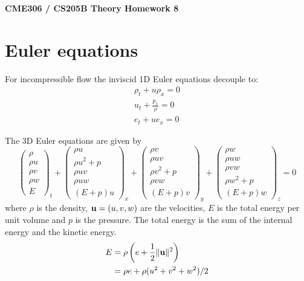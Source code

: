 \documentclass{article}
\begin{document}
\begin{center}
{\bf CME306 / CS205B Theory Homework 8}
\end{center}
\renewcommand{\u}{\ensuremath{{\bf u}}}

\section*{Euler equations}
For incompressible flow the inviscid 1D Euler equations decouple to:
\begin{align*}
  \rho_t + u\rho_x = 0 \\
  u_t + \frac{p_x}{\rho} = 0 \\
  e_t + ue_x = 0
\end{align*}

The 3D Euler equations are given by
\begin{equation}
  \begin{pmatrix}
    \rho \\ \rho u \\ \rho v \\ \rho w \\ E
  \end{pmatrix}_t + 
  \begin{pmatrix}
    \rho u \\ \rho u^2 + p \\ \rho uv \\ \rho uw \\ (E+p)u
  \end{pmatrix}_x + 
  \begin{pmatrix}
    \rho v \\ \rho uv \\ \rho v^2 + p \\ \rho vw \\ (E+p)v
  \end{pmatrix}_y + 
  \begin{pmatrix}
    \rho w \\ \rho uw \\ \rho vw \\ \rho w^2 + p \\ (E+p)w
  \end{pmatrix}_z = 0
\end{equation}
where $\rho$ is the density, $\u = (u,v,w)$ are the velocities, $E$ is the total energy per unit volume and $p$ is the pressure.  The total energy is the sum of the internal energy and
the kinetic energy.
\begin{align*}
  E &= \rho\left(e + \frac{1}{2}\|\u\|^2\right) \\
  &= \rho e + \rho(u^2 + v^2 + w^2)/2
\end{align*}
\end{document}
